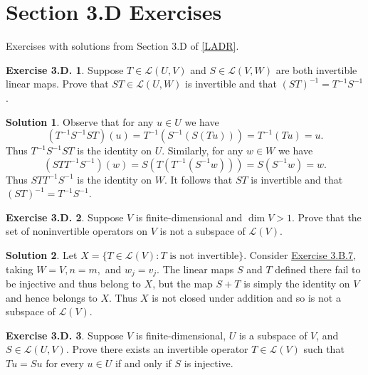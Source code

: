 \documentclass[12pt]{article}
\theoremstyle{definition}
\theoremstyle{exercise}
\newtheorem{exercise}{Exercise 3.D.}
\theoremstyle{solution}
\newtheorem*{solution}{Solution}
\newcommand{\lmap}{\mathcal{L}}
\begin{document}
\section{Section 3.D Exercises}

Exercises with solutions from Section 3.D of \hyperlink{ladr}{[LADR]}.

\begin{exercise}
\label{ex:1}
    Suppose \( T \in \lmap(U, V) \) and \( S \in \lmap(V, W) \) are both invertible linear maps. Prove that \( ST \in \lmap(U, W) \) is invertible and that \( (ST)^{-1} = T^{-1} S^{-1} \).
\end{exercise}

\begin{solution}
    Observe that for any \( u \in U \) we have
    \[
        (T^{-1} S^{-1} S T)(u) = T^{-1}(S^{-1}(S(Tu))) = T^{-1}(Tu) = u.
    \]
    Thus \( T^{-1} S^{-1} S T \) is the identity on \( U \). Similarly, for any \( w \in W \) we have
    \[
        (S T T^{-1} S^{-1})(w) = S(T(T^{-1}(S^{-1}w))) = S(S^{-1}w) = w.
    \]
    Thus \( S T T^{-1} S^{-1} \) is the identity on \( W \). It follows that \( ST \) is invertible and that \( (ST)^{-1} = T^{-1} S^{-1} \).
\end{solution}

\begin{exercise}
\label{ex:2}
    Suppose \( V \) is finite-dimensional and \( \dim V > 1 \). Prove that the set of noninvertible operators on \( V \) is not a subspace of \( \lmap(V) \).
\end{exercise}

\begin{solution}
    Let \( X = \{ T \in \lmap(V) : T \text{ is not invertible} \} \). Consider \href{https://lew98.github.io/Mathematics/LADR_Section_3_B_Exercises.pdf}{Exercise 3.B.7}, taking \( W = V, n = m, \) and \( w_j = v_j \). The linear maps \( S \) and \( T \) defined there fail to be injective and thus belong to \( X \), but the map \( S + T \) is simply the identity on \( V \) and hence belongs to \( X \). Thus \( X \) is not closed under addition and so is not a subspace of \( \lmap(V) \).
\end{solution}

\begin{exercise}
\label{ex:3}
    Suppose \( V \) is finite-dimensional, \( U \) is a subspace of \( V \), and \( S \in \lmap(U, V) \). Prove there exists an invertible operator \( T \in \lmap(V) \) such that \( Tu = Su \) for every \( u \in U \) if and only if \( S \) is injective.
\end{exercise}
\end{document}
